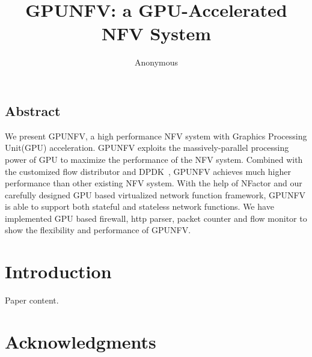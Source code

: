 \documentclass{apnet17}
\begin{document}
 {}
\date{}


\title{GPUNFV: a GPU-Accelerated NFV System}

\author{Anonymous}

\maketitle


\subsection*{Abstract}

We present GPUNFV, a high performance NFV system with Graphics Processing Unit(GPU) acceleration. GPUNFV exploits the massively-parallel processing power of GPU to maximize the performance of the NFV system. Combined with the customized flow distributor and DPDK~\cite{dpdk}, GPUNFV achieves much higher performance than other existing NFV system. With the help of NFactor and our carefully designed GPU based virtualized network function framework, GPUNFV is able to support both stateful and stateless network functions. We have implemented GPU based firewall, http parser, packet counter and flow monitor to show the flexibility and performance of GPUNFV. 

\section{Introduction}

Paper content.

\section*{Acknowledgments}


\begin{small}

\end{small}
\label{last-page}
\end{document}
